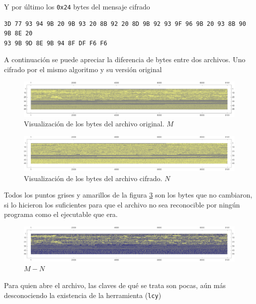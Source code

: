 \documentclass[a4paper]{article}
\begin{document}
Y por último los \texttt{0x24} bytes del mensaje cifrado

\begin{verbatim}
3D 77 93 94 9B 20 9B 93 20 8B 92 20 8D 9B 92 93 9F 96 9B 20 93 8B 90 9B 8E 20
93 9B 9D 8E 9B 94 8F DF F6 F6
\end{verbatim}

A continuación se puede apreciar la diferencia de
bytes entre dos archivos. Uno cifrado por el mismo algoritmo y su versión
original

\begin{figure}[H]
    \centering
    \includegraphics[width=\textwidth]{gr3d}
    \caption{Visualización de los bytes del archivo
original. $M$}
    \label{fig:DatosOrigM1}
\end{figure}

\begin{figure}[H]
    \centering
    \includegraphics[width=\textwidth]{bytes2}
    \caption{Visualización de los bytes del archivo
cifrado. $N$}
    \label{fig:DatosOrigM2}
\end{figure}\oplus\odot

Todos los puntos grises y amarillos de la figura \ref{fig:DatosOrigM3} son los
bytes que no cambiaron, si lo hicieron los suficientes para que el archivo no
sea reconocible por ningún programa como el ejecutable que era.

\begin{figure}[H]
    \centering
    \includegraphics[width=\textwidth]{bytes3}
    \caption{$M-N$}
    \label{fig:DatosOrigM3}
\end{figure}

Para quien abre el archivo, las claves de qué se trata son pocas, aún más
desconociendo la existencia de la herramienta (\texttt{lcy})
\end{document}
